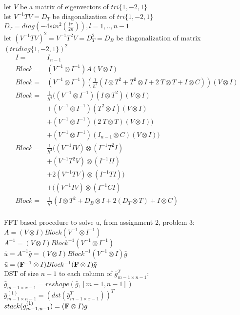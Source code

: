 \documentclass[12pt,letter]{article}
\begin{document}
\begin{enumerate}
\begin{enumerate}
  let $V$ be a matrix of eigenvectors of $tri\{1,-2,1\}$\\
  let $V^{-1}TV=D_T$ be diagonalization of $tri\{1,-2,1\}$\\
  $D_T=diag(-4 sin^2(\frac{l \pi}{2n})), l = 1,..,n-1$\\
  let $(V^{-1}TV)^2=V^{-1}T^2 V=D_T^2=D_B$ be diagonalization of matrix $(tridiag\{1,-2,1\})^2$
  \begin{align*}
    I = & I_{n-1}\\
    Block=&(V^{-1} \otimes I^{-1})A(V \otimes I)\\
    Block=&(V^{-1} \otimes I^{-1})(\frac{1}{h^4}(I \otimes T^2 + T^2 \otimes I +2\ T \otimes T + I \otimes C ))(V \otimes I)\\    
    Block=&\frac{1}{h^4}((V^{-1} \otimes I^{-1})(I \otimes T^2)(V \otimes I)\\
          &+(V^{-1} \otimes I^{-1})(T^2 \otimes I)(V \otimes I)\\
          &+(V^{-1} \otimes I^{-1})(2\ T \otimes T)(V \otimes I))\\
          &+(V^{-1} \otimes I^{-1})(I_{n-1} \otimes C)(V \otimes I))\\
    Block=&\frac{1}{h^4}((V^{-1}IV)\otimes(I^{-1}T^2I)\\
          &+(V^{-1}T^2V)\otimes(I^{-1}II)\\
          &+2(V^{-1}TV)\otimes(I^{-1}TI))\\
          &+((V^{-1}IV)\otimes(I^{-1} C I)\\
    Block=&\frac{1}{h^4}(I\otimes T^2 + D_B \otimes I +2(D_T \otimes T ) + I \otimes C)\\
  \end{align*}

  \pagebreak
  
  FFT based procedure to solve u, from assignment 2, problem 3:\\

  $A=(V \otimes I)Block(V^{-1} \otimes I^{-1})$\\
  $A^{-1}=(V \otimes I)Block^{-1}(V^{-1} \otimes I^{-1})$\\
  $\bar{u}=A^{-1}\bar{g}=(V \otimes I)Block^{-1}(V^{-1} \otimes I)\bar{g}$\\
  $\bar{u}=(\bold{F}^{-1} \otimes I)Block^{-1}(\bold{F} \otimes I)\bar{g}$\\

  DST of size $n-1$ to each column of $\bar{g}_{m-1 \times n-1}^T$:\\
  $\bar{g}_{m-1 \times x-1}=reshape(\bar{g},[m-1,n-1])$\\
  $\bar{g}_{m-1 \times n-1}^{(1)}= (dst(\bar{g}_{m-1 \times x-1}^T))^T$\\
  $stack(\bar{g}_{m-1,n-1}^{(1)}) = (\bold{F} \otimes I) \bar{g}$\\
  

\end{enumerate}
\end{enumerate}
\end{document}
